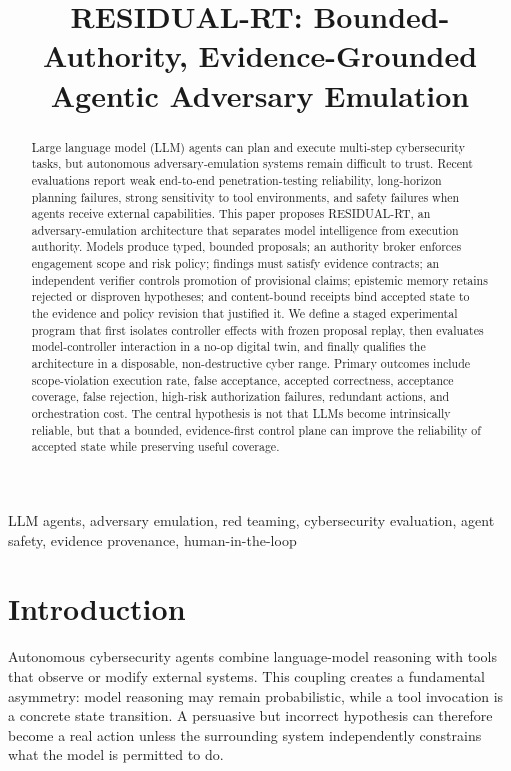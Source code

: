 \documentclass[conference]{IEEEtran}
\title{RESIDUAL-RT: Bounded-Authority, Evidence-Grounded Agentic Adversary Emulation}
\author{
\IEEEauthorblockN{Mike Olivares}
\IEEEauthorblockA{Independent Researcher\\Email omitted for review}
}
\begin{document}
\maketitle

\begin{abstract}
Large language model (LLM) agents can plan and execute multi-step cybersecurity tasks, but autonomous adversary-emulation systems remain difficult to trust. Recent evaluations report weak end-to-end penetration-testing reliability, long-horizon planning failures, strong sensitivity to tool environments, and safety failures when agents receive external capabilities. This paper proposes RESIDUAL-RT, an adversary-emulation architecture that separates model intelligence from execution authority. Models produce typed, bounded proposals; an authority broker enforces engagement scope and risk policy; findings must satisfy evidence contracts; an independent verifier controls promotion of provisional claims; epistemic memory retains rejected or disproven hypotheses; and content-bound receipts bind accepted state to the evidence and policy revision that justified it. We define a staged experimental program that first isolates controller effects with frozen proposal replay, then evaluates model-controller interaction in a no-op digital twin, and finally qualifies the architecture in a disposable, non-destructive cyber range. Primary outcomes include scope-violation execution rate, false acceptance, accepted correctness, acceptance coverage, false rejection, high-risk authorization failures, redundant actions, and orchestration cost. The central hypothesis is not that LLMs become intrinsically reliable, but that a bounded, evidence-first control plane can improve the reliability of accepted state while preserving useful coverage.
\end{abstract}

\begin{IEEEkeywords}
LLM agents, adversary emulation, red teaming, cybersecurity evaluation, agent safety, evidence provenance, human-in-the-loop
\end{IEEEkeywords}

\section{Introduction}
Autonomous cybersecurity agents combine language-model reasoning with tools that observe or modify external systems. This coupling creates a fundamental asymmetry: model reasoning may remain probabilistic, while a tool invocation is a concrete state transition. A persuasive but incorrect hypothesis can therefore become a real action unless the surrounding system independently constrains what the model is permitted to do.
\end{document}
